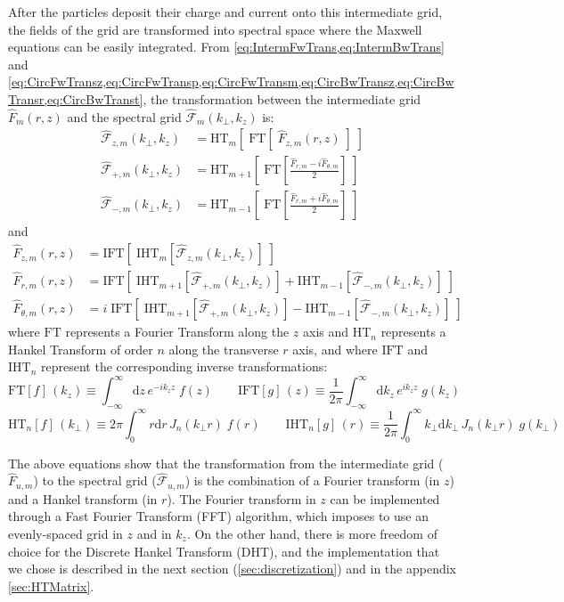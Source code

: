 \documentclass[a4paper]{article}   	%
\newcommand{\Integ}[1]{\int_{-\infty}^{\infty} \!\!\!\!\!\!\!\!
  \mathrm{d}#1}
\newcommand{\RInteg}[1]{\int_{0}^{\infty} \!\!\!\!\!\!\! #1\mathrm{d}#1}
\newcommand{\spectral}[1]{\hat{\mathcal{#1}}}
\begin{document}
After the particles deposit their charge and current onto this
intermediate grid, the fields of the grid are transformed into spectral
space where the Maxwell equations can be easily integrated. From
\cref{eq:IntermFwTrans,eq:IntermBwTrans} and
\cref{eq:CircFwTransz,eq:CircFwTransp,eq:CircFwTransm,eq:CircBwTransz,eq:CircBwTransr,eq:CircBwTranst}, 
the transformation between the intermediate grid $\hat{F}_{m}(r,z)$
and the spectral grid $\spectral{F}_m(k_\perp, k_z)$ is:
\begin{align}
\spectral{F}_{z,m}(k_\perp,k_z) & = \mathrm{HT}_{m} [ \; \mathrm{FT}
                               [ \; \hat{F}_{z,m}(r,z) \; ] \;] \\
\spectral{F}_{+,m}(k_\perp,k_z) &= \mathrm{HT}_{m+1}\left[ \; \mathrm{FT} \left[ \frac{
  \hat{F}_{r,m} -i  \hat{F}_{\theta,m} }{2}  \right] \;\right] \\
\spectral{F}_{-,m}(k_\perp,k_z) &= \mathrm{HT}_{m-1} \left[ \;\mathrm{FT} \left[ \frac{
  \hat{F}_{r,m} +i  \hat{F}_{\theta,m} }{2}  \right] \;\right] 
\end{align}
and
\begin{align}
\hat{F}_{z,m}(r,z) &= \mathrm{IFT} [\; \mathrm{IHT}_{m} [
                         \spectral{F}_{z,m}(k_\perp,k_z) ] \; ] \\
\hat{F}_{r,m}(r,z) & = \mathrm{IFT} \left[ \; \mathrm{IHT}_{m+1}
                         [ \spectral{F}_{+,m}(k_\perp,k_z) ] + \mathrm{IHT}_{m-1} [
                         \spectral{F}_{-,m}(k_\perp,k_z) ] \; \right] \label{eq:FTHTr}\\
\hat{F}_{\theta,m}(r,z) & = i\;\mathrm{IFT} \left[ \; \mathrm{IHT}_{m+1}
                         [ \spectral{F}_{+,m}(k_\perp,k_z) ] -
                          \mathrm{IHT}_{m-1} [
                          \spectral{F}_{-,m}(k_\perp,k_z) ] \; \right]
\label{eq:FTHTt}
\end{align}
where $\mathrm{FT}$ represents a Fourier Transform along the $z$
axis and $\mathrm{HT}_{n}$ represents a Hankel Transform of order
$n$ along the transverse $r$ axis, and where $\mathrm{IFT}$ and
$\mathrm{IHT}_{n}$ represent the corresponding inverse
transformations:
\[ \mathrm{FT} [f]\, (k_z) \equiv \Integ{z} \, e^{-ik_zz} \; f(z) \qquad 
\mathrm{IFT} [g] \,(z)\equiv \frac{1}{2\pi}\Integ{k_z} \, e^{ik_zz} \;  g(k_z)\]
\[ \mathrm{HT}_{n} [f]\,(k_\perp) \equiv 2\pi \RInteg{r} \,
J_{n}(k_\perp r) \; f(r) \qquad 
\mathrm{IHT}_{n} [g]\,(r) \equiv \frac{1}{2\pi}\RInteg{k_\perp} \,  J_{n}(k_\perp r)  \;  g(k_\perp) \]

The above equations show that the transformation from the intermediate
grid ($\hat{F}_{u,m}$) to the spectral grid ($\spectral{F}_{u,m}$) is
the combination of a Fourier transform (in $z$) and a Hankel transform
(in $r$). The Fourier transform in $z$ can be implemented through a Fast Fourier
Transform (FFT) algorithm, which imposes to use an evenly-spaced grid
in $z$ and in $k_z$. On the other hand, there is more freedom of
choice for the Discrete Hankel Transform (DHT), and the implementation that
we chose is described in the next section
(\cref{sec:discretization}) and in the appendix \ref{sec:HTMatrix}.
\end{document}
